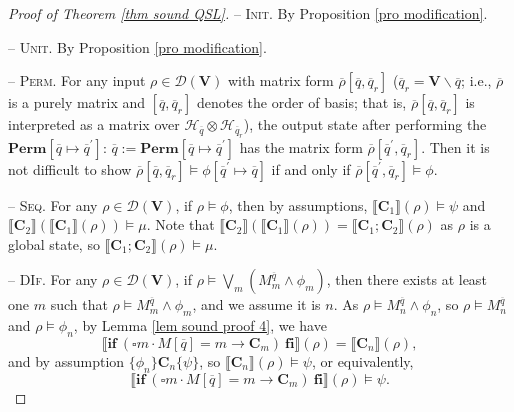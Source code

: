 \documentclass[conference,compsoc, 10pt]{IEEEtran}
\newcommand {\qbar} {{\overline{q}}}
\newcommand {\cD } {{\mathcal{D}}}
\newcommand {\cH } {{\mathcal{H}}}
\newcommand {\vars } {\mathbf{V}}
\newcommand {\prog } {{\mathbf{C}}}
\newcommand {\sem}[1] {\llbracket#1\rrbracket}
\newcommand {\ol}[1] {{\overline{#1}}}
\newcommand {\perm} {\mathbf{Perm}}
\begin{document}
\begin{appendices}
\begin{proof}[Proof of Theorem \ref{thm sound QSL}]
			\vspace{0.4cm}
			
			\noindent -- \textsc{Init}. By Proposition \ref{pro modification}.
			
			\vspace{0.4cm}
			
			\noindent -- \textsc{Unit}. By Proposition \ref{pro modification}.
			
			\vspace{0.4cm}
			
			\noindent -- \textsc{Perm}. For any input $\rho\in\cD(\vars)$ with matrix form $\ol{\rho}[\qbar,\qbar_r]$ ($\qbar_r = \vars\backslash\qbar$; i.e., $\ol{\rho}$ is a purely matrix and $[\qbar,\qbar_r]$ denotes the order of basis; that is, $\ol{\rho}[\qbar,\qbar_r]$ is interpreted as a matrix over $\cH_{\qbar}\otimes\cH_{\qbar_r}$), the output state after performing the $\perm[\qbar\mapsto\qbar^\prime]$: $\qbar:=\perm[\qbar\mapsto\qbar^\prime]$ has the matrix form $\ol{\rho}[\qbar^\prime,\qbar_r]$. Then it is not difficult to show $\ol{\rho}[\qbar,\qbar_r]\models\phi[\qbar^\prime\mapsto\qbar]$ if and only if $\ol{\rho}[\qbar^\prime,\qbar_r]\models\phi$.
			
			\vspace{0.4cm}
			
			\noindent -- \textsc{Seq}. For any $\rho\in\cD(\vars)$, if $\rho\models\phi$, then by assumptions, $\sem{\prog_1}(\rho)\models\psi$ and $\sem{\prog_2}(\sem{\prog_1}(\rho))\models\mu$. Note that $\sem{\prog_2}(\sem{\prog_1}(\rho)) = \sem{\prog_1;\prog_2}(\rho)$ as $\rho$ is a global state, so $\sem{\prog_1;\prog_2}(\rho)\models\mu$.
			
			\vspace{0.4cm}
			
			\noindent -- \textsc{DIf}. For any $\rho\in\cD(\vars)$, if $\rho\models\bigvee_m(M_m^{\qbar}\wedge \phi_m)$, then there exists at least one $m$ such that $\rho\models M_m^{\qbar}\wedge \phi_m$, and we assume it is $n$. As $\rho\models M_n^{\qbar}\wedge \phi_n$, so $\rho\models M_n^{\qbar}$ and $\rho\models\phi_n$, by Lemma \ref{lem sound proof 4}, we have 
			$$\sem{\mathbf{if}\ (\square m\cdot M[\qbar] = m \rightarrow \prog_m )\ \mathbf{fi}}(\rho) = \sem{\prog_n}(\rho),$$
			and by assumption $\{\phi_n\}\prog_n\{\psi\}$, so $\sem{\prog_n}(\rho)\models\psi$, or equivalently, $$\sem{\mathbf{if}\ (\square m\cdot M[\qbar] = m \rightarrow \prog_m )\ \mathbf{fi}}(\rho)\models\psi.$$
			
			\vspace{0.4cm}
			

\end{proof}
\end{appendices}
\end{document}
